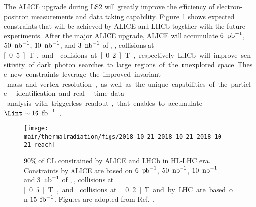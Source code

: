 \documentclass[../report.tex]{subfiles}
\providecommand{\main}{..}
\begin{document}

The ALICE upgrade during LS2 will greatly improve 
the efficiency of electron-positron measurements and data taking capability.
Figure~\ref{fig:darkphoton_alice_lhcb_hllhc} shows 
expected constraints that will be achieved by ALICE and LHCb
together with the future experiments. 
After the major ALICE upgrade, ALICE will accumulate 
$\unit[6]{\Upb^{-1}}$, $\unit[50]{\Unb^{-1}}$, $\unit[10]{\Unb^{-1}}$, and $\unit[3]{\Unb^{-1}}$
of \pp, \pPb, \PbPb{} collisions at \unit[0.5]{T}, and \PbPb{} collisions at \unit[0.2]{T}, 
respectively. 
LHCb will improve sensitivity of dark photon searches to large regions 
of the unexplored space. These new constraints leverage the improved invariant-mass and vertex resolution, 
as well as the unique capabilities of the particle-identification and real-time 
data-analysis with triggerless readout, 
that enables to accumulate $\Lint \sim \unit[16]{\Ufb^{-1}}$~\cite{Ilten:2016tkc}.

\begin{figure}[htbp]
\begin{center}
\texttt{[image: \\main/thermalradiation/figs/2018-10-21-2018-10-21-2018-10-21-reach]}
\end{center}
\caption{90\% of CL constrained by ALICE and LHCb in HL-LHC era.
Constraints by ALICE are based on 
$\unit[6]{\Upb^{-1}}$, $\unit[50]{\Unb^{-1}}$, $\unit[10]{\Unb^{-1}}$, and $\unit[3]{\Unb^{-1}}$
of \pp, \pPb, \PbPb{} collisions at \unit[0.5]{T}, and \PbPb{} collisions at \unit[0.2]{T}
and by LHC are based on $\unit[15]{\Ufb^{-1}}$.
Figures are adopted from Ref.~\cite{Ilten:2018crw}.}
\label{fig:darkphoton_alice_lhcb_hllhc}
\end{figure}
\end{document}
